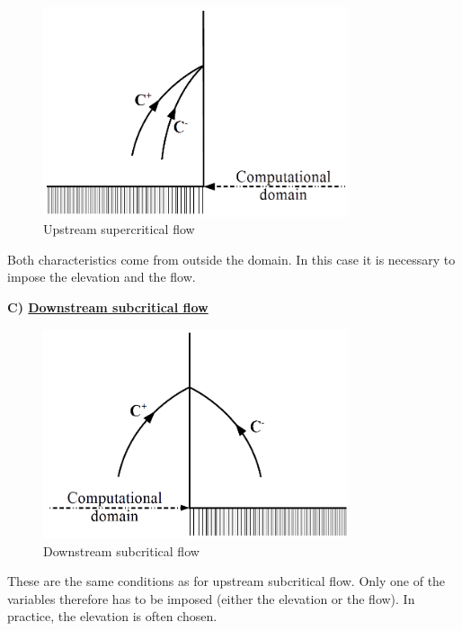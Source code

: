 \begin{figure}[H]
 \begin{center}
  \includegraphics[width=0.8\textwidth]{Figures/AmontTorrentiel.png}
  \caption{Upstream supercritical flow}
 \end{center}
\end{figure}

Both characteristics come from outside the domain. In this case it is necessary to impose the elevation and the flow.

\textbf{C) \underline{Downstream subcritical flow}}

\begin{figure}[H]
 \begin{center}
  \includegraphics[width=0.8\textwidth]{Figures/AvalFluvial.png}
  \caption{Downstream subcritical flow}
 \end{center}
\end{figure}

These are the same conditions as for upstream subcritical flow. Only one of the variables therefore has to be imposed (either the elevation or the flow). In practice, the elevation is often chosen.

